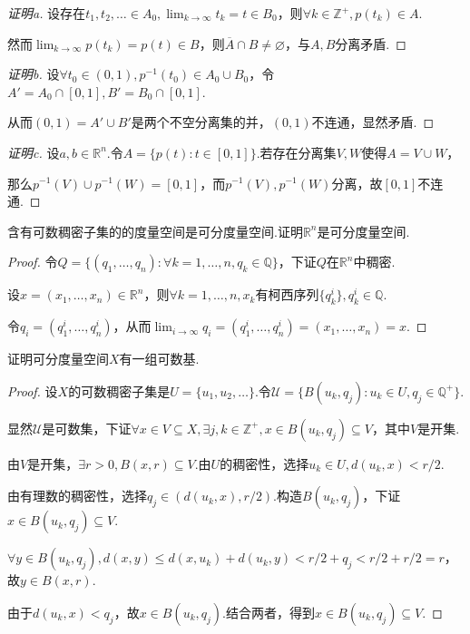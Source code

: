 \begin{proof}[证明a]
    设存在\(t_1, t_2, \dots \in A_0, \lim_{k \to \infty} t_k=t \in B_0\)，则\(\forall k \in \mathbb{Z}^+, p(t_k) \in A\).

    然而\(\lim_{k \to \infty} p(t_k)=p(t) \in B\)，则\(\overline{A} \cap B \ne \varnothing\)，与\(A,B\)分离矛盾.
\end{proof}

\begin{proof}[证明b]
    设\(\forall t_0 \in (0,1), p^{-1}(t_0) \in A_0 \cup B_0\)，令\(A'=A_0 \cap [0,1], B'=B_0 \cap [0,1]\).

    从而\((0,1)=A' \cup B'\)是两个不空分离集的并，\((0,1)\)不连通，显然矛盾.
\end{proof}

\begin{proof}[证明c]
    设\(a,b \in \mathbb{R}^n\).令\(A=\{p(t): t \in [0,1]\}\).若存在分离集\(V,W\)使得\(A=V \cup W\)，

    那么\(p^{-1}(V) \cup p^{-1}(W)=[0,1]\)，而\(p^{-1}(V), p^{-1}(W)\)分离，故\([0,1]\)不连通.
\end{proof}

\begin{problem}[22]\label{1.B.22}
    含有可数稠密子集的的度量空间是可分度量空间.证明\(\mathbb{R}^n\)是可分度量空间.
\end{problem}

\begin{proof}
    令\(Q=\{(q_1, \dots, q_n): \forall k=1, \dots, n, q_k \in \mathbb{Q}\}\)，下证\(Q\)在\(\mathbb{R}^n\)中稠密.

    设\(x=(x_1, \dots, x_n) \in \mathbb{R}^n\)，则\(\forall k=1, \dots, n, x_k\)有柯西序列\(\{q_k^i\}, q_k^i \in \mathbb{Q}\).

    令\(q_i=(q_1^i, \dots, q_n^i)\)，从而\(\lim_{i \to \infty} q_i=(q_1^i, \dots, q_n^i)=(x_1, \dots, x_n)=x\).
\end{proof}

\newpage

\begin{problem}[23]\label{1.B.23}
    证明可分度量空间\(X\)有一组可数基.
\end{problem}

\begin{proof}
    设\(X\)的可数稠密子集是\(U=\{u_1, u_2, \dots\}\).令\(\mathcal{U}=\{B(u_k,q_j): u_k \in U, q_j \in \mathbb{Q}^+\}\).

    显然\(\mathcal{U}\)是可数集，下证\(\forall x \in V \subseteq X, \exists j,k \in \mathbb{Z}^+, x \in B(u_k,q_j) \subseteq V\)，其中\(V\)是开集.

    由\(V\)是开集，\(\exists r>0, B(x,r) \subseteq V\).由\(U\)的稠密性，选择\(u_k \in U, d(u_k,x)<r/2\).

    由有理数的稠密性，选择\(q_j \in (d(u_k,x), r/2)\).构造\(B(u_k,q_j)\)，下证\(x \in B(u_k,q_j) \subseteq V\).

    \(\forall y \in B(u_k,q_j), d(x,y) \leq d(x,u_k)+d(u_k,y)<r/2+q_j<r/2+r/2=r\)，故\(y \in B(x,r)\).

    由于\(d(u_k,x)<q_j\)，故\(x \in B(u_k,q_j)\).结合两者，得到\(x \in B(u_k,q_j) \subseteq V\).
\end{proof}

